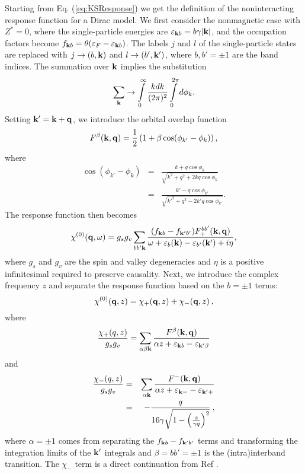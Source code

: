 \documentclass[aps,prb,twocolumn,superscriptaddress]{revtex4-2}
\newcommand{\ef}{\varepsilon_F}
\newcommand{\bfk}{{\bf k}}
\newcommand{\bfkp}{{\bf k'}}
\newcommand{\kp}{k'}
\newcommand{\kpsq}{{\kp}^2}
\newcommand{\bfq}{{\bf q}}
\newcommand{\bp}{b'}
\newcommand{\en}[2]{\varepsilon_{#1}(#2)}
\begin{document}
Starting from Eq. (\ref{eq:KSResponse}) we get the definition of the noninteracting response function for a Dirac model. We first consider the nonmagnetic case with $Z^*=0$,
where the single-particle energies are $\varepsilon_{\bfk b} = b\gamma|\bfk|$, and the occupation factors become $f_{\bfk b} = \theta(\ef-\varepsilon_{\bfk b})$.
The labels $j$ and $l$ of the single-particle states are replaced with
$j \to (b,\bfk)$ and  $ l \to (b',\bfkp)$, where $b,b'=\pm1$ are the band indices.
The summation over $\bfk$ implies the substitution
\begin{equation}
  \sum_{\bfk} \to \int\limits_0^\infty \frac{k dk}{(2\pi)^2} \int\limits_0^{2\pi} d\phi_k.
\end{equation}
Setting $\bfkp = \bfk + \bfq$, we introduce the orbital overlap function
\begin{equation}
  F^\beta(\bfk,\bfq)=\frac{1}{2}\left(1+\beta \cos (\phi_{k'}-\phi_{k})\right),
\end{equation}
where
\begin{eqnarray}
  \cos (\phi_{k'}-\phi_{k}) &=& \frac{k+q \cos \phi_k}{\sqrt{k^2 + q^2 +2kq \cos\phi_k}} \nonumber\\
  &=& \frac{\kp-q \cos\phi_{\kp}}{\sqrt{\kpsq + q^2 -2\kp q \cos \phi_{\kp}}} .
\end{eqnarray}
The response function then becomes
\begin{equation}\label{eq:DiracResponseDef}
  \chi^{(0)}(\bfq,\omega) = g_s g_v\sum_{b\bp\bfk}
  \frac{(f_{\bfk b}-f_{\bfk' b'}) F^{bb'}_+(\bfk,\bfq)}{\omega+\en{b}{\bfk}-\en{\bp}{\bfkp}+i\eta},
\end{equation}
where $g_s$ and $g_v$ are the spin and valley degeneracies and $\eta$ is a positive infinitesimal required to preserve causality.
Next, we introduce the complex frequency $z$ and separate the response function based on the $b=\pm1$ terms:
\begin{equation}
  \chi^{(0)}(\bfq,z) = \chi_+(\bfq,z) + \chi_-(\bfq,z) \:,
\end{equation}
where
\begin{equation}
  \frac{\chi_+(q,z)}{g_sg_v}=\sum_{\alpha \beta \bfk}\frac{F^\beta(\bfk,\bfq)}{\alpha z+\varepsilon_{\bfk b}-\varepsilon_{\bfk'\beta}}
\end{equation}
and
\begin{eqnarray}
  \frac{\chi_-(q,z)}{g_sg_v} &=&
  \sum_{\alpha \bfk}\frac{F^-(\bfk,\bfq)}{\alpha z+\varepsilon_{\bfk-}-\varepsilon_{\bfk'+}}\nonumber\\
  &=& -\frac{q}{16 \gamma \sqrt{1-\left(\frac{z}{\gamma q}\right)^2}} \: ,
\end{eqnarray}
where $\alpha=\pm1$ comes from separating the $f_{\bfk b}-f_{\bfk' b'}$ terms and transforming the integration limits of the $\bfkp$ integrals and $\beta=bb'=\pm1$ is the (intra)interband transition.
The $\chi_-$ term is a direct continuation from Ref \cite{Wunsch2006}.
\end{document}
